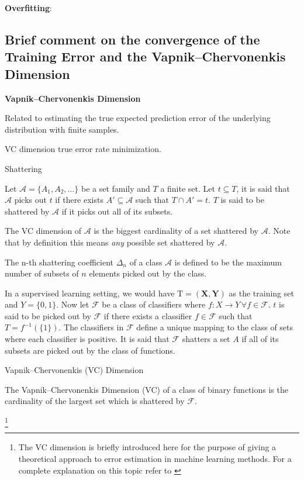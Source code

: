 
\textbf{Overfitting}: 


\subsection{Brief comment on the convergence of the Training Error and the Vapnik–Chervonenkis Dimension}
\textbf{Vapnik–Chervonenkis Dimension}
\cite{vapnik-nature2013}
\cite{cherkassky-learning2007}

Related to estimating the true expected prediction error of the underlying distribution with finite samples.

VC dimension true error rate minimization. 


\begin{definition}{Shattering}

Let $\mathcal {A}= \{A_1,A_{2},\dots \}$ be a set family and $T$ a finite set. Let $t \subseteq T$, it is said that $\mathcal {A}$ picks out $t$ if there exists $A' \subseteq \mathcal {A} $ such that $ T \cap A' = t$. $T$ is said to be shattered by $\mathcal {A}$ if it picks out all of its subsets.

The VC dimension of $\mathcal {A}$ is the biggest cardinality of a set shattered by $\mathcal {A}$. Note that by definition this means \textit{any} possible set shattered by $\mathcal {A}$.
\end{definition}
 
The n-th shattering coefficient $\Delta_n$ of a class $\mathcal {A}$ is defined to be the maximum number of subsets of $n$ elements picked out by the class. 

In a supervised learning setting, we would have $\mathrm{T} = (\textbf{X},\textbf{Y})$ as the training set and $Y = \{0,1 \}$. Now let $\mathcal {F}$ be a class of classifiers where $f: X \rightarrow Y \, \forall f \in \mathcal {F}$. $t$ is said to be picked out by $\mathcal {F}$ if there exists a classifier $f \in \mathcal {F}$ such that $T = f^{-1}(\{1\})$. The classifiers in $\mathcal {F}$ define a unique mapping to the class of sets where each classifier is positive. It is said that $\mathcal {F}$ shatters a set $A$ if all of its subsets are picked out by the class of functions.

\begin{definition}{Vapnik–Chervonenkis (VC) Dimension}
 	
The Vapnik–Chervonenkis Dimension (VC) of a class of binary functions is the cardinality of the largest set which is shattered by $\mathcal {F}$.
\end{definition}\footnote{The VC dimension is briefly introduced here for the purpose of giving a theoretical approach to error estimation in machine learning methods. For a complete explanation on this topic refer to \cite{vapnik-nature2013}}

